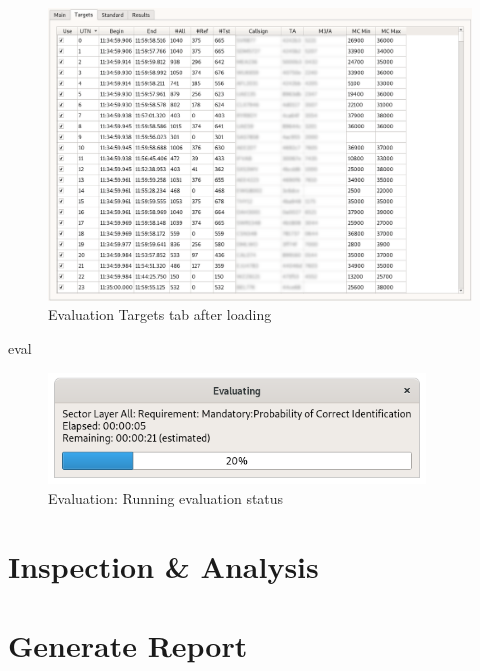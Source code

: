 \begin{figure}[H]
  \hspace*{-2cm}
    \includegraphics[width=18cm,frame]{../screenshots/eval_targets.png}
  \caption{Evaluation Targets tab after loading}
\end{figure}

eval

\begin{figure}[H]
  \centering 
    \includegraphics[width=10cm]{../screenshots/eval_eval_status.png}
  \caption{Evaluation: Running evaluation status}
\end{figure}

\section{Inspection \& Analysis}
\label{sec:eval_inspect} 

\section{Generate Report}
\label{sec:eval_report}
